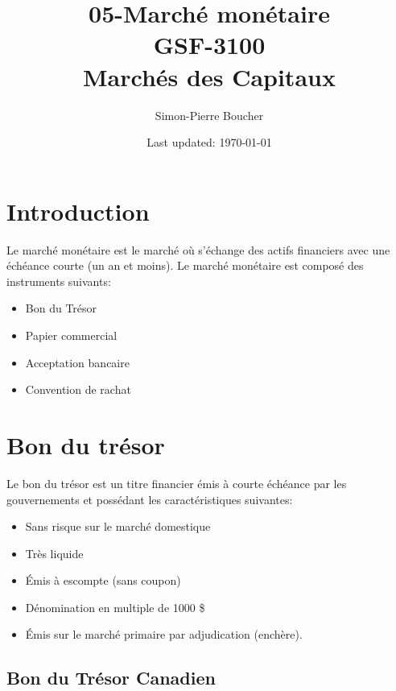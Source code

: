 \documentclass[letterpaper, 12pt]{article}
\newcommand{\1}{\mathds{1}}	%
\theoremstyle{definition}
\begin{document}

\title{05-Marché monétaire \\[1em]
\normalsize GSF-3100 \\ Marchés des Capitaux}


\author{\normalsize Simon-Pierre Boucher}
\date{\normalsize\vspace{-1ex} Last updated: \today}


\maketitle
\tableofcontents\label{sec:contents}


\newpage


\section{Introduction}
Le marché monétaire est le marché où s’échange des actifs financiers avec une échéance courte (un an et moins).  Le marché monétaire est composé des instruments suivants:
\begin{itemize}
\item Bon du Trésor
\item Papier commercial
\item Acceptation bancaire
\item Convention de rachat
\end{itemize}
\section{Bon du trésor}
Le bon du trésor est un titre financier émis à courte échéance par les gouvernements et possédant les caractéristiques suivantes:
\begin{itemize}
\item Sans risque sur le marché domestique
\item Très liquide
\item Émis à escompte (sans coupon)
\item Dénomination en multiple de 1000 \$
\item Émis sur le marché primaire par adjudication (enchère).
\end{itemize}
\newpage
\subsection{Bon du Trésor Canadien}
\end{document}
